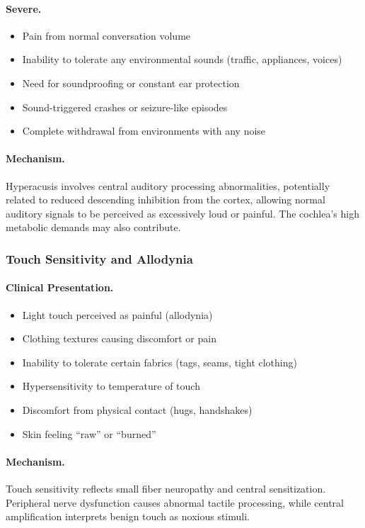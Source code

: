 \paragraph{Severe.}
\begin{itemize}
    \item Pain from normal conversation volume
    \item Inability to tolerate any environmental sounds (traffic, appliances, voices)
    \item Need for soundproofing or constant ear protection
    \item Sound-triggered crashes or seizure-like episodes
    \item Complete withdrawal from environments with any noise
\end{itemize}

\paragraph{Mechanism.}
Hyperacusis involves central auditory processing abnormalities, potentially related to reduced descending inhibition from the cortex, allowing normal auditory signals to be perceived as excessively loud or painful. The cochlea's high metabolic demands may also contribute.

\subsubsection{Touch Sensitivity and Allodynia}

\paragraph{Clinical Presentation.}
\begin{itemize}
    \item Light touch perceived as painful (allodynia)
    \item Clothing textures causing discomfort or pain
    \item Inability to tolerate certain fabrics (tags, seams, tight clothing)
    \item Hypersensitivity to temperature of touch
    \item Discomfort from physical contact (hugs, handshakes)
    \item Skin feeling ``raw'' or ``burned''
\end{itemize}

\paragraph{Mechanism.}
Touch sensitivity reflects small fiber neuropathy and central sensitization. Peripheral nerve dysfunction causes abnormal tactile processing, while central amplification interprets benign touch as noxious stimuli.

